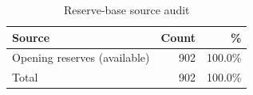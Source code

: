 \begin{table}[htbp]
\centering
\caption{Reserve-base source audit}
\label{tab:reserve_source_audit}
\begin{tabular}{lrr}
\toprule
\textbf{Source} & \textbf{Count} & \textbf{\%} \\
\midrule
Opening reserves (available) & 902 & 100.0\% \\
\midrule
Total & 902 & 100.0\% \\
\bottomrule
\end{tabular}
\end{table}
